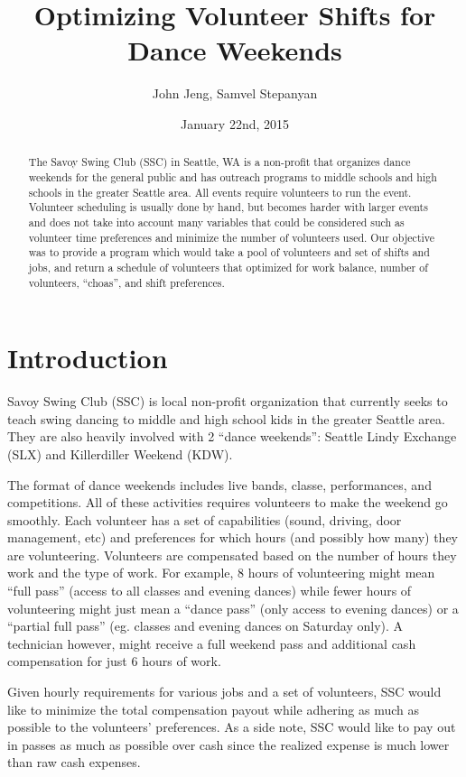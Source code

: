 \documentclass[12pt]{article}
\title{Optimizing Volunteer Shifts for Dance Weekends}
\author{John Jeng, Samvel Stepanyan}
\date{January 22nd, 2015}
\theoremstyle{definition}
\begin{document}
\maketitle
\begin{abstract}
	The Savoy Swing Club (SSC) in Seattle, WA is a non-profit that organizes dance weekends for the general public and has outreach programs to middle schools and high schools in the greater Seattle area. All events require volunteers to run the event. Volunteer scheduling is usually done by hand, but becomes harder with larger events and does not take into account many variables that could be considered such as volunteer time preferences and minimize the number of volunteers used. Our objective was to provide a program which would take a pool of volunteers and set of shifts and jobs, and return a schedule of volunteers that optimized for work balance, number of volunteers, ``choas'', and shift preferences.
\end{abstract}
\newpage
\tableofcontents
\newpage

\section{Introduction}

Savoy Swing Club (SSC) is local non-profit organization that currently seeks to teach swing dancing to middle and high school kids in the greater Seattle area.
They are also heavily involved with 2 “dance weekends”: Seattle Lindy Exchange (SLX) and Killerdiller Weekend (KDW).

The format of dance weekends includes live bands, classe, performances, and competitions. All of these activities requires volunteers to make the weekend go smoothly.
Each volunteer has a set of capabilities (sound, driving, door management, etc) and preferences for which hours (and possibly how many) they are volunteering.
Volunteers are compensated based on the number of hours they work and the type of work.
For example, 8 hours of volunteering might mean “full pass” (access to all classes and evening dances) while fewer hours of volunteering might just mean a “dance pass” (only access to evening dances) or a “partial full pass” (eg. classes and evening dances on Saturday only).
A technician however, might receive a full weekend pass and additional cash compensation for just 6 hours of work.

Given hourly requirements for various jobs and a set of volunteers, SSC would like to minimize the total compensation payout while adhering as much as possible to the volunteers’ preferences. As a side note, SSC would like to pay out in passes as much as possible over cash since the realized expense is much lower than raw cash expenses.
\end{document}
